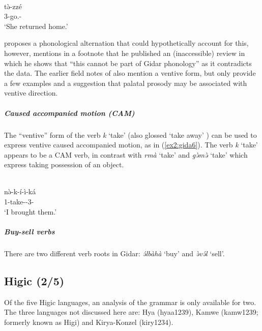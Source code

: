 \ex\label{ex2:gida2}
 \\
\gll tə̀-zzé \\
3-go.- \\
\glt `She returned home.'
\z

\citet[50]{frajzyngierGrammarGidar2008} proposes a phonological alternation that could hypothetically account for this, however, \citet[313]{schuhChadicCornucopia2017} mentions in a footnote that he published an (inaccessible) review in which he shows that ``this cannot be part of Gidar phonology'' as it contradicts the data. The earlier field notes of \citet{schuhDonneesLangueGidar1984} also mention a ventive form, but only provide a few examples and a suggestion that palatal prosody may be associated with ventive direction.

\subparagraph{Caused accompanied motion (CAM)}

The ``ventive'' form of the verb \textit{k} `take' (also glossed `take away' \citep[196]{frajzyngierGrammarGidar2008}) can be used to express ventive caused accompanied motion, as in (\ref{ex2:gida6}). The verb \textit{k} `take' appears to be a CAM verb, in contrast with \textit{rmà} `take' and \textit{gə̀mə̀} `take' which express taking possession of an object. 

\ea\label{ex2:gida6}
 \\
\gll	nə̀-k-í-ì-ká \\
1-take--3- \\
\glt `I brought them.'
\z 

\subparagraph{Buy-sell verbs}

There are two different verb roots in Gidar: \textit{ə́lbàhà} `buy' and \textit{ə̀və́l} `sell'. 

\subsection{Higic (2/5)}

Of the five Higic languages, an analysis of the grammar is only available for two. The three languages not discussed here are: Hya (hyaa1239), Kamwe (kamw1239; formerly known as Higi) and Kirya-Konzel (kiry1234). %

